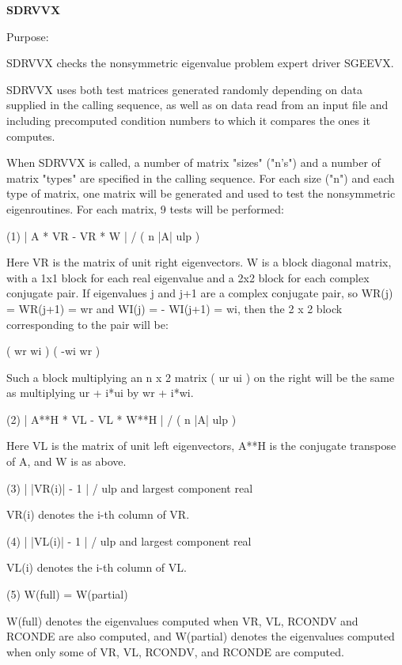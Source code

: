{\bfseries S\+D\+R\+V\+V\+X} 

\begin{DoxyParagraph}{Purpose\+: }
\begin{DoxyVerb}    SDRVVX  checks the nonsymmetric eigenvalue problem expert driver
    SGEEVX.

    SDRVVX uses both test matrices generated randomly depending on
    data supplied in the calling sequence, as well as on data
    read from an input file and including precomputed condition
    numbers to which it compares the ones it computes.

    When SDRVVX is called, a number of matrix "sizes" ("n's") and a
    number of matrix "types" are specified in the calling sequence.
    For each size ("n") and each type of matrix, one matrix will be
    generated and used to test the nonsymmetric eigenroutines.  For
    each matrix, 9 tests will be performed:

    (1)     | A * VR - VR * W | / ( n |A| ulp )

      Here VR is the matrix of unit right eigenvectors.
      W is a block diagonal matrix, with a 1x1 block for each
      real eigenvalue and a 2x2 block for each complex conjugate
      pair.  If eigenvalues j and j+1 are a complex conjugate pair,
      so WR(j) = WR(j+1) = wr and WI(j) = - WI(j+1) = wi, then the
      2 x 2 block corresponding to the pair will be:

              (  wr  wi  )
              ( -wi  wr  )

      Such a block multiplying an n x 2 matrix  ( ur ui ) on the
      right will be the same as multiplying  ur + i*ui  by  wr + i*wi.

    (2)     | A**H * VL - VL * W**H | / ( n |A| ulp )

      Here VL is the matrix of unit left eigenvectors, A**H is the
      conjugate transpose of A, and W is as above.

    (3)     | |VR(i)| - 1 | / ulp and largest component real

      VR(i) denotes the i-th column of VR.

    (4)     | |VL(i)| - 1 | / ulp and largest component real

      VL(i) denotes the i-th column of VL.

    (5)     W(full) = W(partial)

      W(full) denotes the eigenvalues computed when VR, VL, RCONDV
      and RCONDE are also computed, and W(partial) denotes the
      eigenvalues computed when only some of VR, VL, RCONDV, and
      RCONDE are computed.


\end{DoxyVerb}
\end{DoxyParagraph}
